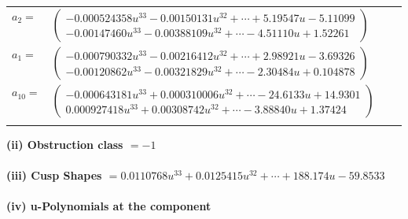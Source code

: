 \documentclass[1p]{elsarticle_modified}
\theoremstyle{definition}
\begin{document}
\begin{tabular}{m{7pt} m{180pt} m{7pt} m{180pt} }
\flushright $a_{2}=$&$\begin{pmatrix}-0.000524358 u^{33}-0.00150131 u^{32}+\cdots+5.19547 u-5.11099\\-0.00147460 u^{33}-0.00388109 u^{32}+\cdots-4.51110 u+1.52261\end{pmatrix}$ \\
\flushright $a_{1}=$&$\begin{pmatrix}-0.000790332 u^{33}-0.00216412 u^{32}+\cdots+2.98921 u-3.69326\\-0.00120862 u^{33}-0.00321829 u^{32}+\cdots-2.30484 u+0.104878\end{pmatrix}$ \\
\flushright $a_{10}=$&$\begin{pmatrix}-0.000643181 u^{33}+0.000310006 u^{32}+\cdots-24.6133 u+14.9301\\0.000927418 u^{33}+0.00308742 u^{32}+\cdots-3.88840 u+1.37424\end{pmatrix}$\\&\end{tabular}
\flushleft \textbf{(ii) Obstruction class $= -1$}\\~\\
\flushleft \textbf{(iii) Cusp Shapes $= 0.0110768 u^{33}+0.0125415 u^{32}+\cdots+188.174 u-59.8533$}\\~\\
\newpage\renewcommand{\arraystretch}{1}
\flushleft \textbf{(iv) u-Polynomials at the component}\newline \\
\end{document}
